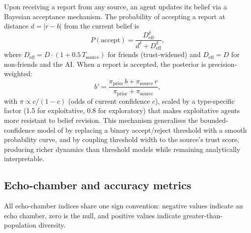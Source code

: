 \documentclass[sn-apacite]{sn-jnl}
\begin{document}
Upon receiving a report from any source, an agent updates its belief via a Bayesian acceptance mechanism. The probability of accepting a report at distance $d = |r - b|$ from the current belief is
\begin{equation}
P(\text{accept}) = \frac{D_{\text{eff}}^{\delta}}{d^{\delta} + D_{\text{eff}}^{\delta}},
\label{eq:accept}
\end{equation}
where $D_{\text{eff}} = D \cdot (1 + 0.5\, T_{\text{source}})$ for friends (trust-widened) and $D_{\text{eff}} = D$ for non-friends and the AI. When a report is accepted, the posterior is precision-weighted:
\begin{equation}
b' = \frac{\pi_{\text{prior}}\, b + \pi_{\text{source}}\, r}{\pi_{\text{prior}} + \pi_{\text{source}}},
\label{eq:posterior}
\end{equation}
with $\pi \propto c/(1-c)$ (odds of current confidence $c$), scaled by a type-specific factor (1.5 for exploitative, 0.8 for exploratory) that makes exploitative agents more resistant to belief revision. This mechanism generalises the bounded-confidence model of \citet{deffuant2000mixing} by replacing a binary accept/reject threshold with a smooth probability curve, and by coupling threshold width to the source's trust score, producing richer dynamics than threshold models while remaining analytically interpretable.

\subsection{Echo-chamber and accuracy metrics}\label{sec:metrics}

All echo-chamber indices share one sign convention: negative values indicate an echo chamber, zero is the null, and positive values indicate greater-than-population diversity.
\end{document}

